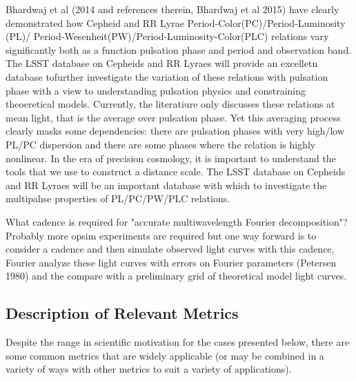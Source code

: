 Bhardwaj et al (2014 and references therein, Bhardwaj et al 2015) have clearly demonstrated how Cepheid and RR Lyrae
Period-Color(PC)/Period-Luminosity (PL)/
Period-Wesenheit(PW)/Period-Luminosity-Color(PLC) relations vary significantly both as a function pulsation phase and period and observation band. 
The LSST database on Cepheids and RR Lyraes will provide an excelletn database tofurther investigate the variation of these relations with pulsation phase
with a view to understanding pulsation physics and constraining theoeretical models. Currently, the literatiure only
discusses these relations at mean light, that is the average over pulsation phase. Yet this averaging process clearly masks some
dependencies: there are pulsation phases with very high/low PL/PC dispersion and there are some phases where the relation is highly nonlinear.
In the era of precision cosmology, it is important to understand the tools that we use to construct a distance scale. The LSST database on
Cepheids and RR Lyraes will be an important database with which to investigate the multipahse properties of PL/PC/PW/PLC relations.

What cadence is required for "accurate multiwavelength Fourier decomposition"? 
Probably more opsim experiments are required but one way forward is to consider a cadence and then simulate observed light curves with this 
cadence, Fourier analyze these light curves with errors on Fourier parameters (Petersen 1980) and the compare with a preliminary grid
of theoretical model light curves.



\subsection{Description of Relevant Metrics}
\label{sec:\chpname:variablemetrics}

Despite the range in scientific motivation for the cases presented below, there are some common metrics that are widely applicable (or may be combined in a variety of ways with other metrics to suit a variety of applications).


